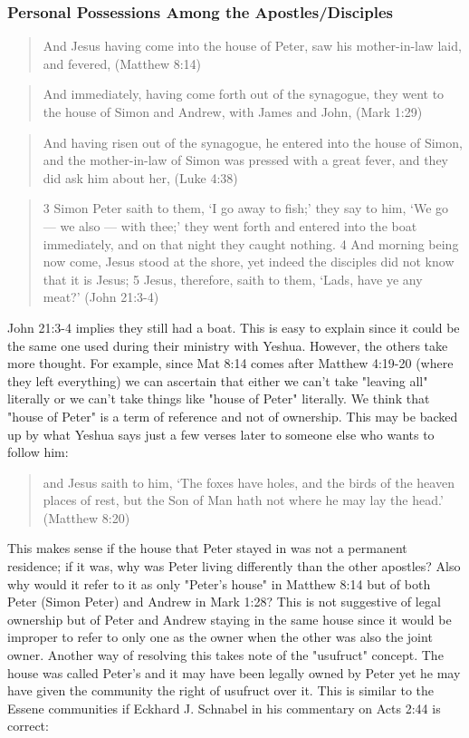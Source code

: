 \documentclass[11pt]{article}
\begin{document}
\subsubsection{Personal Possessions Among the Apostles/Disciples}
\begin{quote}
And Jesus having come into the house of Peter, saw his mother-in-law laid, and fevered, (Matthew 8:14)
\end{quote}
\begin{quote}
And immediately, having come forth out of the synagogue, they went to the house of Simon and Andrew, with James and John, (Mark 1:29)
\end{quote}
\begin{quote}
And having risen out of the synagogue, he entered into the house of Simon, and the mother-in-law of Simon was pressed with a great fever, and they did ask him about her, (Luke 4:38)
\end{quote}
\begin{quote}
3 Simon Peter saith to them, ‘I go away to fish;’ they say to him, ‘We go — we also — with thee;’ they went forth and entered into the boat immediately, and on that night they caught nothing.
4 And morning being now come, Jesus stood at the shore, yet indeed the disciples did not know that it is Jesus; 5 Jesus, therefore, saith to them, ‘Lads, have ye any meat?’ 
(John 21:3-4)
\end{quote}
John 21:3-4 implies they still had a boat. This is easy to explain since it could be the same one used during their ministry with Yeshua. However, the others take more thought. For example, since Mat 8:14 comes after Matthew 4:19-20 (where they left everything) we can ascertain that either we can't take "leaving all" literally or we can't take things like "house of Peter" literally. We think that "house of Peter" is a term of reference and not of ownership. This may be backed up by what Yeshua says just a few verses later to someone else who wants to follow him: 
\begin{quote}
and Jesus saith to him, ‘The foxes have holes, and the birds of the heaven places of rest, but the Son of Man hath not where he may lay the head.’ (Matthew 8:20) 
\end{quote}
This makes sense if the house that Peter stayed in was not a permanent residence; if it was, why was Peter living differently than the other apostles? Also why would it refer to it as only "Peter's house" in Matthew 8:14 but of both Peter (Simon Peter) and Andrew in Mark 1:28? This is not suggestive of legal ownership but of Peter and Andrew staying in the same house since it would be improper to refer to only one as the owner when the other was also the joint owner. Another way of resolving this takes note of the "usufruct" concept. The house was called Peter's and it may have been legally owned by Peter yet he may have given the community the right of usufruct over it. This is similar to the Essene communities if Eckhard J. Schnabel in his commentary on Acts 2:44 is correct:
\end{document}
